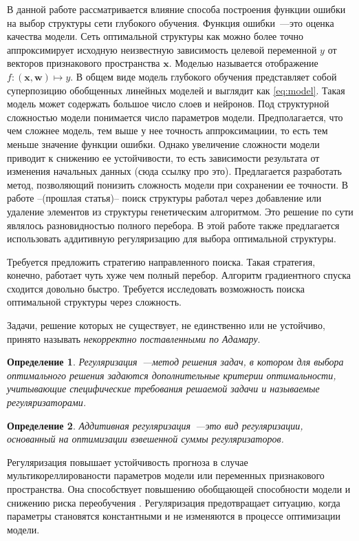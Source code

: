 \documentclass[12pt, twoside]{article}
\newcommand{\xb}{{\mathbf{x}}}
\newenvironment{comment}{}{}
\newcommand{\wm}{{\mathbf{w}}}
\newtheorem{definition}{Определение}
\begin{document}
В данной работе рассматривается влияние способа построения функции ошибки на выбор структуры сети глубокого обучения. Функция ошибки~---это оценка качества модели. Сеть оптимальной структуры как можно более точно аппроксимирует исходную неизвестную зависимость целевой переменной $y$ от векторов признакового пространства $\xb$. Моделью называется отображение $f:(\xb,\wm)\mapsto y$. В общем виде модель глубокого обучения представляет собой суперпозицию обобщенных линейных моделей и выглядит как \eqref{eq:model}. Такая модель может содержать большое число слоев и нейронов. Под структурной сложностью модели понимается число параметров модели. Предполагается, что чем сложнее модель, тем выше у нее точность аппроксимациии, то есть тем меньше значение функции ошибки. Однако увеличение сложности модели приводит к снижению ее устойчивости, то есть зависимости результата от изменения начальных данных (сюда ссылку про это). Предлагается разработать метод, позволяющий понизить сложность модели при сохранении ее точности. В работе --(прошлая статья)-- поиск структуры работал через добавление или удаление элементов из структуры генетическим алгоритмом. Это решение по сути являлось разновидностью полного перебора. В этой работе также предлагается использовать аддитивную регуляризацию для выбора оптимальной структуры. 

\begin{comment}
    Требуется предложить стратегию направленного поиска. Такая стратегия, конечно, работает чуть хуже чем полный перебор. 
Алгоритм градиентного спуска сходится довольно быстро. Требуется исследовать возможность поиска оптимальной структуры через сложность. 
\end{comment}


Задачи, решение которых не существует, не единственно или не устойчиво, принято называть \textit{некорректно поставленными по Адамару}\cite{tikhonov1977solutions}.
\begin{definition}%
Регуляризация~---метод решения задач, в котором для выбора оптимального решения задаются дополнительные критерии
оптимальности, учитывающие специфические требования решаемой задачи и называемые регуляризаторами. 
\end{definition}
\begin{definition}%
Аддитивная регуляризация~---это вид регуляризации, основанный на оптимизации взвешенной суммы регуляризаторов. 
\end{definition}
Регуляризация повышает устойчивость прогноза в случае мультикореллированости параметров модели или переменных признакового пространства. Она способствует повышению обобщающей способности модели и снижению риска переобучения \cite{svensen2007pattern}. Регуляризация предотвращает ситуацию, когда параметры становятся константными и не изменяются в процессе оптимизации модели.
\end{document}
